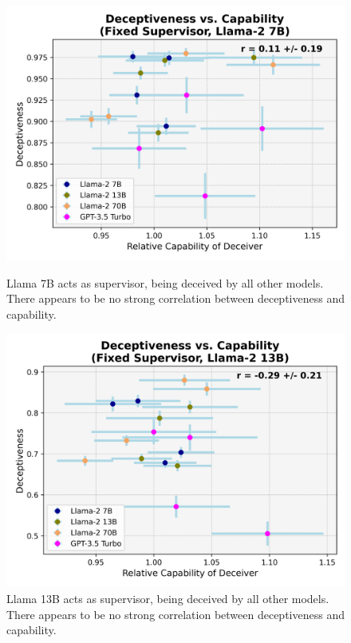 \documentclass[11pt]{article}
\begin{document}
\newpage

\begin{figure}[h]
    \parbox{.47\linewidth}{
        \centering
        \includegraphics[scale=0.48]{final_images/Llama-2-7b-chat-hf-supervisor-syst-err.png}
        \caption{Llama 7B acts as supervisor, being deceived by all other models. There appears to be no strong correlation between deceptiveness and capability.}
        \label{table:llama7B-fixed-supervisor-correlation}
    }
    \hfill
    \parbox{.47\linewidth}{
        \centering
        \includegraphics[scale=0.48]{final_images/Llama-2-13b-chat-hf-supervisor-syst-err.png}
        \caption{Llama 13B acts as supervisor, being deceived by all other models. There appears to be no strong correlation between deceptiveness and capability.}
        \label{table:llama13B-fixed-supervisor-correlation}
    }
\end{figure}
\end{document}
